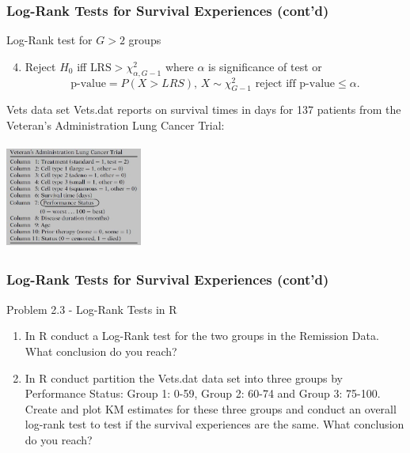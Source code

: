 \documentclass{beamer}
\theoremstyle{definition}
\begin{document}
\begin{frame}
\frametitle{Log-Rank Tests for Survival Experiences (cont'd)}
\begin{block}{Log-Rank test for $G>2$ groups}
\begin{enumerate}
\setcounter{enumi}{3}
\item Reject $H_0$ iff $\text{LRS} > \chi^2_{\alpha,G-1}$ where $\alpha$ is significance of test or
\[
\text{p-value} = P(X>LRS), \,  X \sim \chi^2_{G-1} \text{ reject iff p-value} \le \alpha.
\]
\end{enumerate}
\end{block}
\begin{block}{Vets data set}
Vets.dat reports on survival times in days for 137 patients from the Veteran’s Administration Lung Cancer Trial:
\begin{center}
\includegraphics[width =4.5cm, height=3.5cm]{CH2_Vets}
\end{center}
\end{block}
\end{frame}
\begin{frame}
\frametitle{Log-Rank Tests for Survival Experiences (cont'd)}
\begin{block}{Problem 2.3 - Log-Rank Tests in R}
\begin{enumerate}
\item In R conduct a Log-Rank test for the two groups in the Remission Data. What conclusion do you reach?
\item In R conduct partition the Vets.dat data set into three groups by Performance Status: Group 1: 0-59, Group 2: 60-74 and Group 3: 75-100. Create and plot KM estimates for these three groups and conduct an overall log-rank test to test if the survival experiences are the same. What conclusion do you reach?
\end{enumerate}
\end{block} 
\end{frame}
\end{document}

